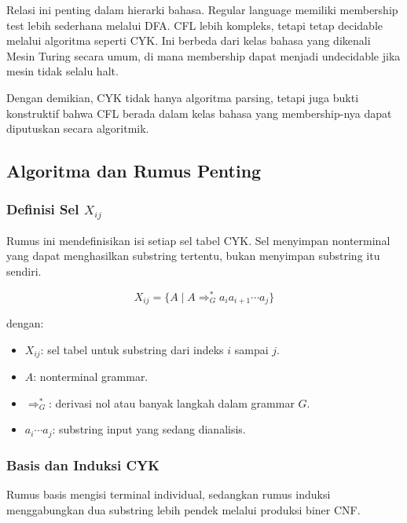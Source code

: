 Relasi ini penting dalam hierarki bahasa. Regular language memiliki membership test lebih sederhana melalui DFA. CFL lebih kompleks, tetapi tetap decidable melalui algoritma seperti CYK. Ini berbeda dari kelas bahasa yang dikenali Mesin Turing secara umum, di mana membership dapat menjadi undecidable jika mesin tidak selalu halt.

Dengan demikian, CYK tidak hanya algoritma parsing, tetapi juga bukti konstruktif bahwa CFL berada dalam kelas bahasa yang membership-nya dapat diputuskan secara algoritmik.

\subsection{Algoritma dan Rumus Penting}

\subsubsection{\texorpdfstring{Definisi Sel $X_{ij}$}{Definisi Sel Xij}}

\begin{jawab}
Rumus ini mendefinisikan isi setiap sel tabel CYK. Sel menyimpan nonterminal yang dapat menghasilkan substring tertentu, bukan menyimpan substring itu sendiri.
\end{jawab}

\begin{equation}
    X_{ij}=\{A\mid A\Rightarrow_G^* a_i a_{i+1}\cdots a_j\}
    \label{eq:definisi-xij}
\end{equation}

dengan:
\begin{itemize}
    \item $X_{ij}$: sel tabel untuk substring dari indeks $i$ sampai $j$.
    \item $A$: nonterminal grammar.
    \item $\Rightarrow_G^*$: derivasi nol atau banyak langkah dalam grammar $G$.
    \item $a_i\cdots a_j$: substring input yang sedang dianalisis.
\end{itemize}

\subsubsection{Basis dan Induksi CYK}

\begin{jawab}
Rumus basis mengisi terminal individual, sedangkan rumus induksi menggabungkan dua substring lebih pendek melalui produksi biner CNF.
\end{jawab}

